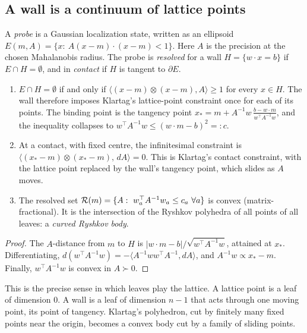 \label{sec:leaves}
\subsection{A wall is a continuum of lattice points}
A \emph{probe} is a Gaussian localization state, written as an ellipsoid $E(m,A)=\{x:\ A(x-m)\cdot(x-m)<1\}$. Here $A$ is the precision at the
chosen Mahalanobis radius. The probe is \emph{resolved} for a wall $H=\{w\cdot x=b\}$ if $E\cap H=\emptyset$, and in \emph{contact} if $H$ is
tangent to $\partial E$.
\begin{proposition}\label{prop:sliding}
\begin{enumerate}[leftmargin=*]
\item $E\cap H=\emptyset$ if and only if $\langle(x-m)\otimes(x-m),A\rangle\ge1$ for every $x\in H$. The wall therefore imposes Klartag's
lattice-point constraint once for each of its points. The binding point is the tangency point
$x_*=m+A^{-1}w\,\frac{b-w\cdot m}{w^\top A^{-1}w}$, and the inequality collapses to $w^\top A^{-1}w\le(w\cdot m-b)^2=:c$.
\item At a contact, with fixed centre, the infinitesimal constraint is $\langle(x_*-m)\otimes(x_*-m),\,dA\rangle=0$. This is Klartag's contact
constraint, with the lattice point replaced by the wall's tangency point, which slides as $A$ moves.
\item The resolved set $\Ryshkov(m)=\{A:\ w_a^\top A^{-1}w_a\le c_a\ \forall a\}$ is convex (matrix-fractional). It is the intersection of the
Ryshkov polyhedra of all points of all leaves: a \emph{curved Ryshkov body}.
\end{enumerate}
\end{proposition}
\begin{proof}
The $A$-distance from $m$ to $H$ is $|w\cdot m-b|/\sqrt{w^\top A^{-1}w}$, attained at $x_*$. Differentiating, $d(w^\top A^{-1}w)=-\langle A^{-1}ww^\top A^{-1},dA\rangle$, and
$A^{-1}w\propto x_*-m$. Finally, $w^\top A^{-1}w$ is convex in $A\succ0$.
\end{proof}
This is the precise sense in which leaves play the lattice. A lattice point is a leaf of dimension $0$. A wall is a leaf of dimension
$n-1$ that acts through one moving point, its point of tangency. Klartag's polyhedron, cut by finitely many fixed points near the
origin, becomes a convex body cut by a family of sliding points.

